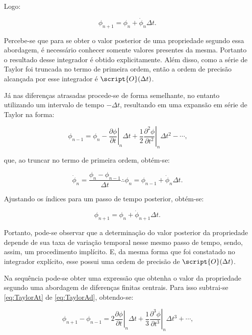 \noindent Logo:

\begin{equation}
    \phi_{n+1}=\phi_n+\dot{\phi}_n\Delta t\text{.}
\end{equation}

Percebe-se que para se obter o valor posterior de uma propriedade segundo essa abordagem, é necessário conhecer somente valores presentes da mesma. Portanto o resultado desse integrador é obtido explicitamente. Além disso, como a série de Taylor foi truncada no termo de primeira ordem, então a ordem de precisão alcançada por esse integrador é $\script{O}(\Delta t)$.

Já nas diferenças atrasadas procede-se de forma semelhante, no entanto utilizando um intervalo de tempo $-\Delta t$, resultando em uma expansão em série de Taylor na forma:

\begin{equation}
    \phi_{n-1}=\phi_n-\left.\frac{\partial\phi}{\partial t}\right|_n\Delta t+\frac{1}{2}\left.\frac{\partial^2\phi}{\partial t^2}\right|_n\Delta t^2-\cdots\text{,}\label{eq:TaylorAt}
\end{equation}

\noindent que, ao truncar no termo de primeira ordem, obtém-se:

\begin{equation}
    \dot{\phi}_n=\frac{\phi_n-\phi_{n-1}}{\Delta t}\therefore
    \phi_n=\phi_{n-1}+\dot{\phi}_n\Delta t\text{.}
\end{equation}

\noindent Ajustando os índices para um passo de tempo posterior, obtém-se:

\begin{equation}
    \phi_{n+1}=\phi_n+\dot{\phi}_{n+1}\Delta t\text{.}
\end{equation}

Portanto, pode-se observar que a determinação do valor posterior da propriedade depende de sua taxa de variação temporal nesse mesmo passo de tempo, sendo, assim, um procedimento implícito. E, da mesma forma que foi constatado no integrador explícito, esse possui uma ordem de precisão de $\script{O}(\Delta t)$.

Na sequência pode-se obter uma expressão que obtenha o valor da propriedade segundo uma abordagem de diferenças finitas centrais. Para isso subtrai-se \ref{eq:TaylorAt} de \ref{eq:TaylorAd}, obtendo-se:

\begin{equation}
    \phi_{n+1}-\phi_{n-1}=2\left.\frac{\partial\phi}{\partial t}\right|_n\Delta t+\frac{1}{3}\left.\frac{\partial^3\phi}{\partial t^3}\right|_n\Delta t^3+\cdots\text{,}\label{eq:TaylorCen}
\end{equation}

